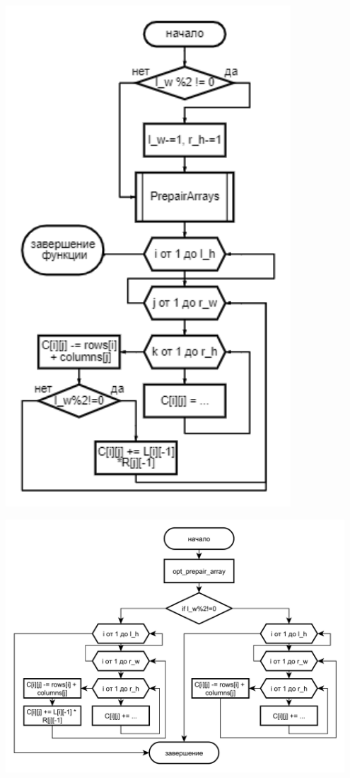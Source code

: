 \documentclass[14pt]{article}
\begin{document}
\begin{center}
		\includegraphics[width = 0.8\textwidth, height = 0.9\textheight]{diagram_5}
		\label{fig:label5}
		
		
		\includegraphics[width = 0.95\textwidth, height = 0.7\textheight]{diagram_6}
		\label{fig:label6}
	\end{center}
	\newpage
\end{document}
